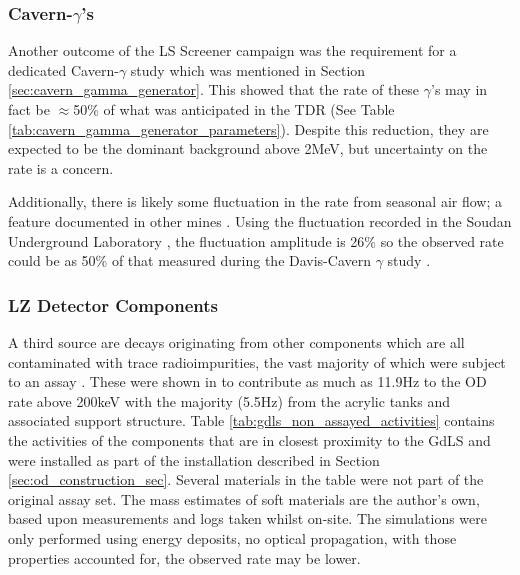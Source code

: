 \subsubsection{Cavern-$\gamma$'s}
\par
Another outcome of the LS Screener campaign was the requirement for a dedicated Cavern-$\gamma$ study which was mentioned in Section \ref{sec:cavern_gamma_generator}.
This showed that the rate of these $\gamma$'s may in fact be $\approx$50\% of what was anticipated in the TDR \cite{LZ_TechnicalDesignReview_ref} (See Table \ref{tab:cavern_gamma_generator_parameters}).
Despite this reduction, they are expected to be the dominant background above 2MeV, but uncertainty on the rate is a concern.
\par
Additionally, there is likely some fluctuation in the rate from seasonal air flow; a feature documented in other mines \cite{finnish_mine_radon_ref,nepal_mine_radon_ref,minos_annual_modulation_ref}.
Using the fluctuation recorded in the Soudan Underground Laboratory \cite{cavern_gammas_in_Soudan_mine_ref}, the fluctuation amplitude is 26\% so the observed rate could be as 50\% of that measured during the Davis-Cavern $\gamma$ study \cite{LZ_Gamma_Ray_Background_ref}. 

\subsubsection{LZ Detector Components}
\par
A third source are decays originating from other components which are all contaminated with trace radioimpurities, the vast majority of which were subject to an assay \cite{LZ_assay_ref}.
These were shown in \cite{scotthaselschwardt_thesis_ref} to contribute as much as 11.9Hz to the OD rate above 200keV with the majority (5.5Hz) from the acrylic tanks and associated support structure.
Table \ref{tab:gdls_non_assayed_activities} contains the activities of the components that are in closest proximity to the GdLS and were installed as part of the installation described in Section \ref{sec:od_construction_sec}.
Several materials in the table were not part of the original assay set.
The mass estimates of soft materials are the author's own, based upon measurements and logs taken whilst on-site.
The simulations were only performed using energy deposits, no optical propagation, with those properties accounted for, the observed rate may be lower.

